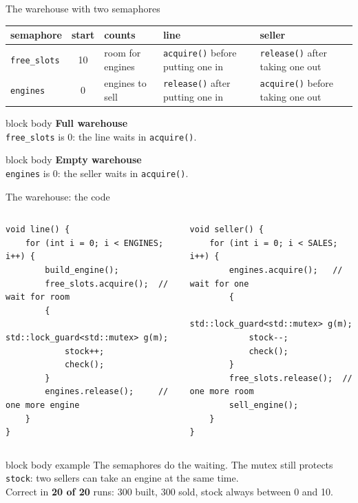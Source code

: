 \documentclass[aspectratio=169,10pt]{beamer}
\newcommand{\stepbox}[2]{%
  \begin{beamercolorbox}[rounded=true,sep=0.09cm,wd=\linewidth]{block body}
    \footnotesize\textbf{#1}\\ #2
  \end{beamercolorbox}\vspace{0.06cm}}
\newcommand{\keymsg}[1]{%
  \begin{beamercolorbox}[rounded=true,sep=0.1cm,wd=\textwidth]{block body example}
    \centering\footnotesize #1
  \end{beamercolorbox}}
\begin{document}
\begin{frame}{The warehouse with two semaphores}
  \vfill
  \begin{center}
    \footnotesize
    \renewcommand{\arraystretch}{1.4}
    \begin{tabular}{@{}l c l l l@{}}
      \toprule
      \textbf{semaphore} & \textbf{start} & \textbf{counts} & \textbf{line} & \textbf{seller} \\
      \midrule
      \texttt{free\_slots} & 10 & room for engines & \texttt{acquire()} before putting one in & \texttt{release()} after taking one out \\
      \texttt{engines} & 0 & engines to sell & \texttt{release()} after putting one in & \texttt{acquire()} before taking one out \\
      \bottomrule
    \end{tabular}
  \end{center}
  \vfill
  \stepbox{Full warehouse}{\texttt{free\_slots} is 0: the line waits in \texttt{acquire()}.}
  \stepbox{Empty warehouse}{\texttt{engines} is 0: the seller waits in \texttt{acquire()}.}
\end{frame}

\begin{frame}[fragile]{The warehouse: the code}
  \begin{columns}[T,onlytextwidth]
\begin{lstlisting}[style=cpp]
void line() {
    for (int i = 0; i < ENGINES; i++) {
        build_engine();
        free_slots.acquire();  // wait for room
        {
            std::lock_guard<std::mutex> g(m);
            stock++;
            check();
        }
        engines.release();     // one more engine
    }
}
\end{lstlisting}
\begin{lstlisting}[style=cpp]
void seller() {
    for (int i = 0; i < SALES; i++) {
        engines.acquire();   // wait for one
        {
            std::lock_guard<std::mutex> g(m);
            stock--;
            check();
        }
        free_slots.release();  // one more room
        sell_engine();
    }
}
\end{lstlisting}
  \end{columns}
  \vfill
  \keymsg{The semaphores do the waiting. The mutex still protects \texttt{stock}: two sellers can take an engine
    at the same time.\\ Correct in \textbf{20 of 20} runs: 300 built, 300 sold, stock always between 0 and 10.}
\end{frame}
\end{document}

